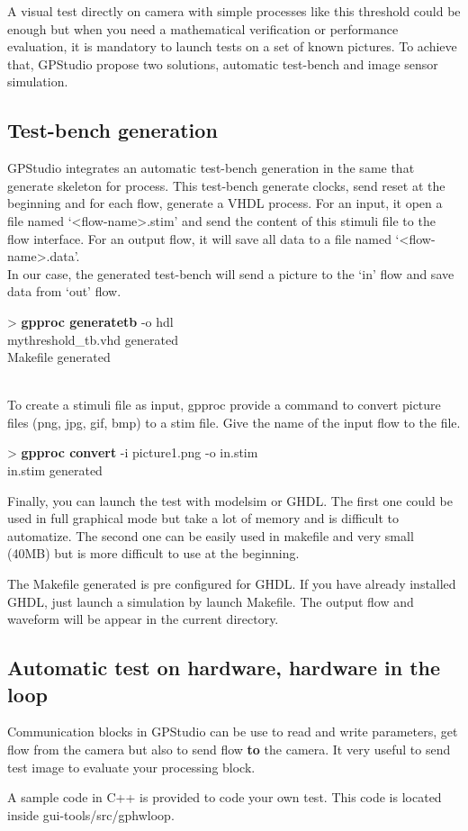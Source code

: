 \documentclass[10pt,a4paper]{article}
\begin{document}
A visual test directly on camera with simple processes like this threshold could be enough but when you need a mathematical verification or performance evaluation, it is mandatory to launch tests on a set of known pictures. To achieve that, GPStudio propose two solutions, automatic test-bench and image sensor simulation.

\subsection{Test-bench generation}

GPStudio integrates an automatic test-bench generation in the same that generate skeleton for process. This test-bench generate clocks, send reset at the beginning and for each flow, generate a VHDL process. For an input, it open a file named `<flow-name>.stim' and send the content of this stimuli file to the flow interface. For an output flow, it will save all data to a file named `<flow-name>.data'. \\

In our case, the generated test-bench will send a picture to the `in' flow and save data from `out' flow.
\begin{sample}
> \textbf{gpproc generatetb} -o hdl \\
mythreshold\_tb.vhd generated \\
Makefile generated
\end{sample}\\

To create a stimuli file as input, gpproc provide a command to convert picture files (png, jpg, gif, bmp) to a stim file. Give the name of the input flow to the file.
\begin{sample}
> \textbf{gpproc convert} -i picture1.png -o in.stim \\
in.stim generated
\end{sample}

Finally, you can launch the test with modelsim or GHDL. The first one could be used in full graphical mode but take a lot of memory and is difficult to automatize. The second one can be easily used in makefile and very small (40MB) but is more difficult to use at the beginning.

The Makefile generated is pre configured for GHDL. If you have already installed GHDL, just launch a simulation by launch Makefile. The output flow and waveform will be appear in the current directory.

\subsection{Automatic test on hardware, hardware in the loop}

Communication blocks in GPStudio can be use to read and write parameters, get flow from the camera but also to send flow \textbf{to} the camera. It very useful to send test image to evaluate your processing block.

A sample code in C++ is provided to code your own test. This code is located inside gui-tools/src/gphwloop.
\end{document}
